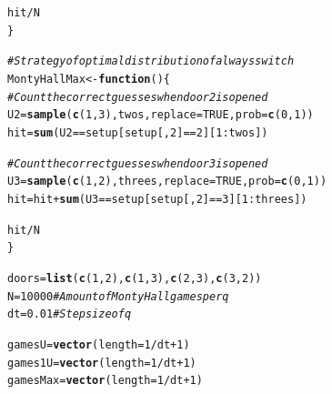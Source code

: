 \documentclass[twoside,a4paper]{article}
\makeatletter
\theoremstyle{plain}
\theoremstyle{definition}
\theoremstyle{remark}
\numberwithin{equation}{section}
\newcommand{\hlnum}[1]{\textcolor[rgb]{0.686,0.059,0.569}{#1}}%
\newcommand{\hlcom}[1]{\textcolor[rgb]{0.678,0.584,0.686}{\textit{#1}}}%
\newcommand{\hlopt}[1]{\textcolor[rgb]{0,0,0}{#1}}%
\newcommand{\hlstd}[1]{\textcolor[rgb]{0.345,0.345,0.345}{#1}}%
\newcommand{\hlkwa}[1]{\textcolor[rgb]{0.161,0.373,0.58}{\textbf{#1}}}%
\newcommand{\hlkwb}[1]{\textcolor[rgb]{0.69,0.353,0.396}{#1}}%
\newcommand{\hlkwc}[1]{\textcolor[rgb]{0.333,0.667,0.333}{#1}}%
\newcommand{\hlkwd}[1]{\textcolor[rgb]{0.737,0.353,0.396}{\textbf{#1}}}%
\newenvironment{kframe}{%
 \def\at@end@of@kframe{}%
 \ifinner\ifhmode%
  \def\at@end@of@kframe{\end{minipage}}%
  \begin{minipage}{\columnwidth}%
 \fi\fi%
 \def\FrameCommand##1{\hskip\@totalleftmargin \hskip-\fboxsep
 \colorbox{shadecolor}{##1}\hskip-\fboxsep
     \hskip-\linewidth \hskip-\@totalleftmargin \hskip\columnwidth}%
 \MakeFramed {\advance\hsize-\width
   \@totalleftmargin\z@ \linewidth\hsize
   \@setminipage}}%
 {\par\unskip\endMakeFramed%
 \at@end@of@kframe}
\newenvironment{knitrout}{}{} %
\DeclareMathOperator{\1}{\mathbbm{1}}
\makeatother
\begin{document}
\begin{knitrout}
\begin{kframe}
\begin{alltt}
  \hlstd{hit}\hlopt{/}\hlstd{N}
\hlstd{\}}

\hlcom{# Strategy of optimal distribution of always switch}
\hlstd{MontyHallMax} \hlkwb{<-} \hlkwa{function}\hlstd{() \{}
  \hlcom{# Count the correct guesses when door 2 is opened}
  \hlstd{U2} \hlkwb{=} \hlkwd{sample}\hlstd{(}\hlkwd{c}\hlstd{(}\hlnum{1}\hlstd{,}\hlnum{3}\hlstd{), twos,} \hlkwc{replace} \hlstd{=} \hlnum{TRUE}\hlstd{,} \hlkwc{prob} \hlstd{=} \hlkwd{c}\hlstd{(}\hlnum{0}\hlstd{,}\hlnum{1}\hlstd{))}
  \hlstd{hit} \hlkwb{=} \hlkwd{sum}\hlstd{(U2} \hlopt{==} \hlstd{setup[setup[,}\hlnum{2}\hlstd{]} \hlopt{==} \hlnum{2}\hlstd{][}\hlnum{1}\hlopt{:}\hlstd{twos])}

  \hlcom{# Count the correct guesses when door 3 is opened}
  \hlstd{U3} \hlkwb{=} \hlkwd{sample}\hlstd{(}\hlkwd{c}\hlstd{(}\hlnum{1}\hlstd{,}\hlnum{2}\hlstd{), threes,} \hlkwc{replace} \hlstd{=} \hlnum{TRUE}\hlstd{,} \hlkwc{prob} \hlstd{=} \hlkwd{c}\hlstd{(}\hlnum{0}\hlstd{,}\hlnum{1}\hlstd{))}
  \hlstd{hit} \hlkwb{=} \hlstd{hit} \hlopt{+} \hlkwd{sum}\hlstd{(U3} \hlopt{==} \hlstd{setup[setup[,}\hlnum{2}\hlstd{]} \hlopt{==} \hlnum{3}\hlstd{][}\hlnum{1}\hlopt{:}\hlstd{threes])}

  \hlstd{hit}\hlopt{/}\hlstd{N}
\hlstd{\}}

\hlstd{doors} \hlkwb{=} \hlkwd{list}\hlstd{(}\hlkwd{c}\hlstd{(}\hlnum{1}\hlstd{,}\hlnum{2}\hlstd{),} \hlkwd{c}\hlstd{(}\hlnum{1}\hlstd{,}\hlnum{3}\hlstd{),} \hlkwd{c}\hlstd{(}\hlnum{2}\hlstd{,}\hlnum{3}\hlstd{),} \hlkwd{c}\hlstd{(}\hlnum{3}\hlstd{,}\hlnum{2}\hlstd{))}
\hlstd{N} \hlkwb{=} \hlnum{10000} \hlcom{# Amount of Monty Hall games per q}
\hlstd{dt} \hlkwb{=} \hlnum{0.01} \hlcom{# Step size of q}

\hlstd{gamesU} \hlkwb{=} \hlkwd{vector}\hlstd{(}\hlkwc{length}\hlstd{=}\hlnum{1}\hlopt{/}\hlstd{dt}\hlopt{+}\hlnum{1}\hlstd{)}
\hlstd{games1U} \hlkwb{=} \hlkwd{vector}\hlstd{(}\hlkwc{length}\hlstd{=}\hlnum{1}\hlopt{/}\hlstd{dt}\hlopt{+}\hlnum{1}\hlstd{)}
\hlstd{gamesMax} \hlkwb{=} \hlkwd{vector}\hlstd{(}\hlkwc{length}\hlstd{=}\hlnum{1}\hlopt{/}\hlstd{dt}\hlopt{+}\hlnum{1}\hlstd{)}


\end{alltt}
\end{kframe}
\end{knitrout}
\end{document}
